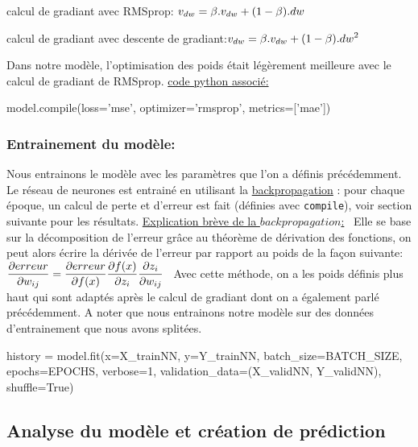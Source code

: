 \documentclass[a4paper,oneside,11pt]{article}
\newcommand{\ds}{\ensuremath{\displaystyle}}
\begin{document}
calcul de gradiant avec RMSprop: $\ds{v_{dw}= \beta . v_{dw} + (1 - \beta) . dw}$

calcul de gradiant avec descente de gradiant:$\ds{v_{dw}= \beta . v_{dw} + (1 - \beta) . dw^2}$


Dans notre modèle, l'optimisation des poids était légèrement meilleure avec le calcul de gradiant de RMSprop.\newline
\underline{code python associé:}
\begin{code-Python}
model.compile(loss='mse', optimizer='rmsprop', metrics=['mae'])
\end{code-Python}

\subsubsection*{Entrainement du modèle:}
%
\qquad Nous entrainons le modèle avec les paramètres que l'on a définis précédemment. Le réseau de neurones est entrainé en utilisant la \underline{backpropagation} : pour chaque époque, un calcul de perte et d'erreur est fait (définies avec \verb+compile+), voir section suivante pour les résultats. \newline
\underline{Explication brève de la $backpropagation$:}\newline
\ Elle se base sur la décomposition de l'erreur grâce au théorème de dérivation des fonctions, on peut alors écrire la dérivée de l'erreur par rapport au poids de la façon suivante: $\ds{\frac{\partial erreur}{\partial w_{ij}}= \frac{\partial erreur}{\partial f(x)}\frac{\partial f(x)}{\partial z_i}\frac{\partial z_i}{\partial w_{ij}}}$ \newline
\ Avec cette méthode, on a les poids définis plus haut qui sont adaptés après le calcul de gradiant dont on a également parlé précédemment. \newline
A noter que nous entrainons notre modèle sur des données d'entrainement que nous avons splitées.
\begin{code-Python}
history = model.fit(x=X_trainNN, y=Y_trainNN, batch_size=BATCH_SIZE, 
epochs=EPOCHS, verbose=1, validation_data=(X_validNN, Y_validNN), 
                    shuffle=True)
\end{code-Python}


\subsection*{Analyse du modèle et création de prédiction}
%
\end{document}
